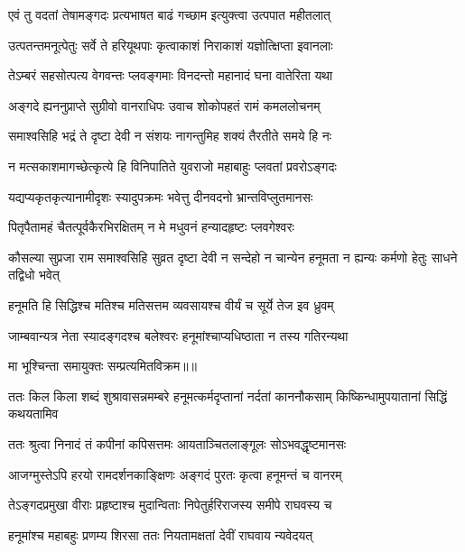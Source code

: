 \twolineshloka
{एवं तु वदतां तेषामङ्गदः प्रत्यभाषत}
{बाढं गच्छाम इत्युक्त्वा उत्पपात महीतलात्} %

\twolineshloka
{उत्पतन्तमनूत्पेतुः सर्वे ते हरियूथपाः}
{कृत्वाकाशं निराकाशं यज्ञोत्क्षिप्ता इवानलाः} %

\twolineshloka
{तेऽम्बरं सहसोत्पत्य वेगवन्तः प्लवङ्गमाः}
{विनदन्तो महानादं घना वातेरिता यथा} %

\twolineshloka
{अङ्गदे ह्यननुप्राप्ते सुग्रीवो वानराधिपः}
{उवाच शोकोपहतं रामं कमललोचनम्} %

\twolineshloka
{समाश्वसिहि भद्रं ते दृष्टा देवी न संशयः}
{नागन्तुमिह शक्यं तैरतीते समये हि नः} %

\twolineshloka
{न मत्सकाशमागच्छेत्कृत्ये हि विनिपातिते}
{युवराजो महाबाहुः प्लवतां प्रवरोऽङ्गदः} %

\twolineshloka
{यद्यप्यकृतकृत्यानामीदृशः स्यादुपक्रमः}
{भवेत्तु दीनवदनो भ्रान्तविप्लुतमानसः} %

\twolineshloka
{पितृपैतामहं चैतत्पूर्वकैरभिरक्षितम्}
{न मे मधुवनं हन्यादहृष्टः प्लवगेश्वरः} %

\threelineshloka
{कौसल्या सुप्रजा राम समाश्वसिहि सुव्रत}
{दृष्टा देवी न सन्देहो न चान्येन हनूमता}
{न ह्यन्यः कर्मणो हेतुः साधने तद्विधो भवेत्} %

\twolineshloka
{हनूमति हि सिद्धिश्च मतिश्च मतिसत्तम}
{व्यवसायश्च वीर्यं च सूर्ये तेज इव ध्रुवम्} %

\twolineshloka
{जाम्बवान्यत्र नेता स्यादङ्गदश्च बलेश्वरः}
{हनूमांश्चाप्यधिष्ठाता न तस्य गतिरन्यथा} %

{मा भूश्चिन्ता समायुक्तः सम्प्रत्यमितविक्रम॥॥} %

\addtocounter{shlokacount}{1}

\threelineshloka
{ततः किल किला शब्दं शुश्रावासन्नमम्बरे}
{हनूमत्कर्मदृप्तानां नर्दतां काननौकसाम्}
{किष्किन्धामुपयातानां सिद्धिं कथयतामिव} %

\twolineshloka
{ततः श्रुत्वा निनादं तं कपीनां कपिसत्तमः}
{आयताञ्चितलाङ्गूलः सोऽभवद्धृष्टमानसः} %

\twolineshloka
{आजग्मुस्तेऽपि हरयो रामदर्शनकाङ्क्षिणः}
{अङ्गदं पुरतः कृत्वा हनूमन्तं च वानरम्} %

\twolineshloka
{तेऽङ्गदप्रमुखा वीराः प्रहृष्टाश्च मुदान्विताः}
{निपेतुर्हरिराजस्य समीपे राघवस्य च} %

\twolineshloka
{हनूमांश्च महाबहुः प्रणम्य शिरसा ततः}
{नियतामक्षतां देवीं राघवाय न्यवेदयत्} %

